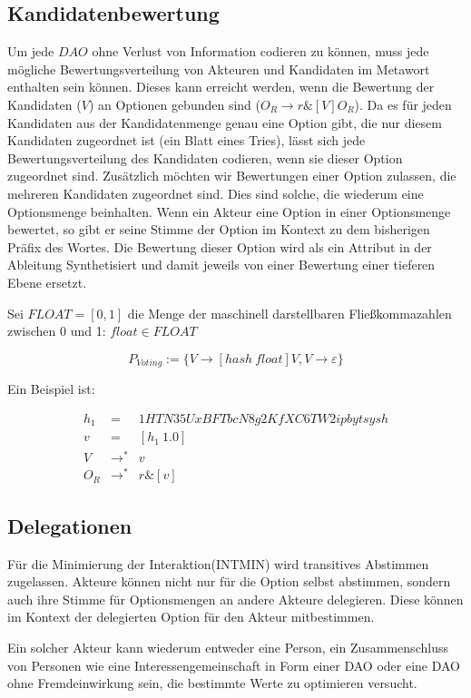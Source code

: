 \documentclass[a4paper,12pt]{report}
\begin{document}
\subsection*{Kandidatenbewertung}
Um jede $DAO$ ohne Verlust von Information codieren zu können, muss jede mögliche Bewertungsverteilung von Akteuren und Kandidaten im Metawort enthalten sein können. 
Dieses kann erreicht werden, wenn die Bewertung der Kandidaten ($V$) an Optionen gebunden sind ($O_R \rightarrow r\& [V] O_R$). Da es für jeden Kandidaten aus der Kandidatenmenge genau eine Option gibt, die nur diesem Kandidaten zugeordnet ist (ein Blatt eines Tries), lässt sich jede Bewertungsverteilung des Kandidaten codieren, wenn sie dieser Option zugeordnet sind. Zusätzlich möchten wir Bewertungen einer Option zulassen, die mehreren Kandidaten zugeordnet sind. Dies sind solche, die wiederum eine Optionsmenge beinhalten. Wenn ein Akteur eine Option in einer Optionsmenge bewertet, so gibt er seine Stimme der Option im Kontext zu dem bisherigen Präfix des Wortes.
Die Bewertung dieser Option wird als ein Attribut in der Ableitung Synthetisiert\cite{Knuth1968} und damit jeweils von einer Bewertung einer tieferen Ebene ersetzt.

Sei $FLOAT = [0,1]$ die Menge der maschinell darstellbaren Fließkommazahlen zwischen 0 und 1: $float\in FLOAT$

\[ P_{Voting} := \{V\rightarrow [hash\ float]V, V \rightarrow \varepsilon\} \] 
  
 Ein Beispiel ist:

\begin{eqnarray}
  h_1 &=& 1HTN35UxBFTbcN8g2KfXC6TW2ipbytsysh\\
  v &=& [h_1\ 1.0] \\
  V &\rightarrow^*& v \\
  O_R &\rightarrow^*& r\&[v]
\end{eqnarray}



\subsection*{Delegationen}

Für die Minimierung der Interaktion(INTMIN) wird transitives Abstimmen zugelassen. Akteure können nicht nur für die Option selbst abstimmen, sondern auch ihre Stimme für Optionsmengen an andere Akteure delegieren. Diese können im Kontext der delegierten Option für den Akteur mitbestimmen.

Ein solcher Akteur kann wiederum entweder eine Person, ein Zusammenschluss von Personen wie eine Interessengemeinschaft in Form einer DAO oder eine DAO ohne Fremdeinwirkung sein, die bestimmte Werte zu optimieren versucht.
\end{document}
